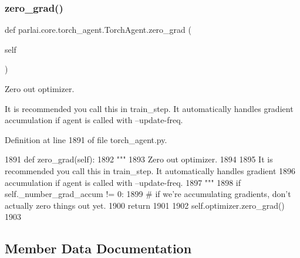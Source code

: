 \mbox{\label{classparlai_1_1core_1_1torch__agent_1_1TorchAgent_a91c163f3e2d39b380095b7083f673b6e}} 
\subsubsection{\texorpdfstring{zero\+\_\+grad()}{zero\_grad()}}
{\footnotesize\ttfamily def parlai.\+core.\+torch\+\_\+agent.\+Torch\+Agent.\+zero\+\_\+grad (\begin{DoxyParamCaption}\item[{}]{self }\end{DoxyParamCaption})}

\begin{DoxyVerb}Zero out optimizer.

It is recommended you call this in train_step. It automatically handles gradient
accumulation if agent is called with --update-freq.
\end{DoxyVerb}
 

Definition at line 1891 of file torch\+\_\+agent.\+py.


\begin{DoxyCode}
1891     \textcolor{keyword}{def }zero\_grad(self):
1892         \textcolor{stringliteral}{"""}
1893 \textcolor{stringliteral}{        Zero out optimizer.}
1894 \textcolor{stringliteral}{}
1895 \textcolor{stringliteral}{        It is recommended you call this in train\_step. It automatically handles gradient}
1896 \textcolor{stringliteral}{        accumulation if agent is called with --update-freq.}
1897 \textcolor{stringliteral}{        """}
1898         \textcolor{keywordflow}{if} self.\_number\_grad\_accum != 0:
1899             \textcolor{comment}{# if we're accumulating gradients, don't actually zero things out yet.}
1900             \textcolor{keywordflow}{return}
1901 
1902         self.optimizer.zero\_grad()
1903 
\end{DoxyCode}


\subsection{Member Data Documentation}
\mbox{\label{classparlai_1_1core_1_1torch__agent_1_1TorchAgent_a63011fa9bd927de8acc9ffa676caa73a}} 
